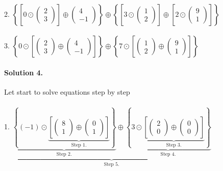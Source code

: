 \documentclass[11pt]{article}
\begin{document}
\paragraph{}2.
$
\left\{
\left[
0
\odot
\begin{pmatrix}
2\\
3
\end{pmatrix}
\right]
\oplus
\begin{pmatrix}
4\\
-1
\end{pmatrix}
\right\}
\oplus
\left\{
\left[
3
\odot
\begin{pmatrix}
1\\
2
\end{pmatrix}
\right]
\oplus
\left[
2
\odot
\begin{pmatrix}
9\\
1
\end{pmatrix}
\right]
\right\}
$
\paragraph{}3.
$
\left\{
0
\odot
\left[
\begin{pmatrix}
2\\
3
\end{pmatrix}
\oplus
\begin{pmatrix}
4\\
-1
\end{pmatrix}
\right]
\right\}
\oplus
\left\{
7
\odot
\left[
\begin{pmatrix}
1\\
2
\end{pmatrix}
\oplus
\begin{pmatrix}
9\\
1
\end{pmatrix}
\right]
\right\}
$

\paragraph{Solution 4.}Let start to solve equations step by step
\paragraph{}1.
$
\underbrace{
\underbrace{
\left\{
(-1) \odot
\underbrace{
\left[
\begin{pmatrix}
8\\
1
\end{pmatrix}
\oplus
\begin{pmatrix}
0\\
1
\end{pmatrix}
\right]
}_\text{Step 1.}
\right\}
}_\text{Step 2.}
\oplus
\underbrace{
\left\{
3
\odot
\underbrace{
\left[
\begin{pmatrix}
2\\
0
\end{pmatrix}
\oplus
\begin{pmatrix}
0\\
0
\end{pmatrix}
\right]
}_\text{Step 3.}
\right\}
}_\text{Step 4.}
}_\text{Step 5.}
$
\end{document}
